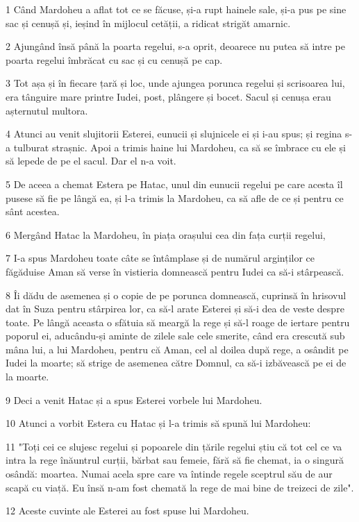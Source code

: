 \par 1 Când Mardoheu a aflat tot ce se făcuse, și-a rupt hainele sale, și-a pus pe sine sac și cenușă și, ieșind în mijlocul cetății, a ridicat strigăt amarnic.
\par 2 Ajungând însă până la poarta regelui, s-a oprit, deoarece nu putea să intre pe poarta regelui îmbrăcat cu sac și cu cenușă pe cap.
\par 3 Tot așa și în fiecare țară și loc, unde ajungea porunca regelui și scrisoarea lui, era tânguire mare printre Iudei, post, plângere și bocet. Sacul și cenușa erau așternutul multora.
\par 4 Atunci au venit slujitorii Esterei, eunucii și slujnicele ei și i-au spus; și regina s-a tulburat strașnic. Apoi a trimis haine lui Mardoheu, ca să se îmbrace cu ele și să lepede de pe el sacul. Dar el n-a voit.
\par 5 De aceea a chemat Estera pe Hatac, unul din eunucii regelui pe care acesta îl pusese să fie pe lângă ea, și l-a trimis la Mardoheu, ca să afle de ce și pentru ce sânt acestea.
\par 6 Mergând Hatac la Mardoheu, în piața orașului cea din fața curții regelui,
\par 7 I-a spus Mardoheu toate câte se întâmplase și de numărul arginților ce făgăduise Aman să verse în vistieria domnească pentru Iudei ca să-i stârpească.
\par 8 Îi dădu de asemenea și o copie de pe porunca domnească, cuprinsă în hrisovul dat în Suza pentru stârpirea lor, ca să-l arate Esterei și să-i dea de veste despre toate. Pe lângă aceasta o sfătuia să meargă la rege și să-l roage de iertare pentru poporul ei, aducându-și aminte de zilele sale cele smerite, când era crescută sub mâna lui, a lui Mardoheu, pentru că Aman, cel al doilea după rege, a osândit pe Iudei la moarte; să strige de asemenea către Domnul, ca să-i izbăvească pe ei de la moarte.
\par 9 Deci a venit Hatac și a spus Esterei vorbele lui Mardoheu.
\par 10 Atunci a vorbit Estera cu Hatac și l-a trimis să spună lui Mardoheu:
\par 11 "Toți cei ce slujesc regelui și popoarele din țările regelui știu că tot cel ce va intra la rege înăuntrul curții, bărbat sau femeie, fără să fie chemat, ia o singură osândă: moartea. Numai acela spre care va întinde regele sceptrul său de aur scapă cu viață. Eu însă n-am fost chemată la rege de mai bine de treizeci de zile".
\par 12 Aceste cuvinte ale Esterei au fost spuse lui Mardoheu.
